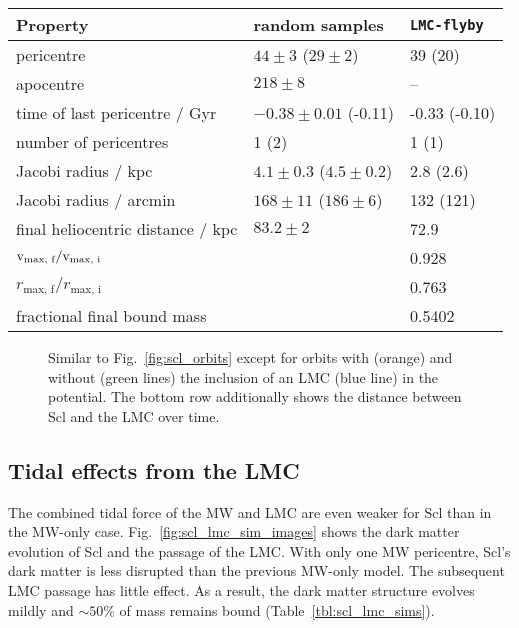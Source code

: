 \begin{table*}[t]
\centering
\caption[Orbits and results for Scl in the LMC potential.]{The orbital properties and dark matter evolution for the models including an LMC. Similar to Table \ref{tbl:scl_sim_results} except quantities with respect to the LMC are in parentheses. }
\label{tbl:scl_lmc_sims}
\begin{tabular}{lll}
\toprule
Property & random samples & \texttt{LMC-flyby}\\
\midrule
pericentre & $44\pm 3$ ($29 \pm 2$) & 39 (20)\\
apocentre & $218 \pm 8$ & –\\
time of last pericentre / Gyr & $-0.38\pm0.01$ (-0.11) & -0.33 (-0.10)\\
number of pericentres & 1 (2) & 1 (1)\\
Jacobi radius / kpc & $4.1\pm0.3$ ($4.5\pm0.2$) & 2.8 (2.6)\\
Jacobi radius / arcmin & $168 \pm 11$ ($186\pm6$) & 132 (121)\\
final heliocentric distance / kpc & $83.2\pm2$ & 72.9\\
${\rm v}_\textrm{max, f} / {\rm v}_\textrm{max, i}$ &  & 0.928\\
$r_\textrm{max, f} / r_\textrm{max, i}$ &  & 0.763\\
fractional final bound mass &  & 0.5402\\
\bottomrule
\end{tabular}
\end{table*}

\begin{figure}
\centering
{}
\caption[Sculptor orbits with LMC]{Similar to Fig.~\ref{fig:scl_orbits}
except for orbits with (orange) and without (green lines) the inclusion
of an LMC (blue line) in the potential. The bottom row additionally
shows the distance between Scl and the LMC over
time.}\label{fig:scl_lmc_orbits_effect}
\end{figure}

\subsection{Tidal effects from the
LMC}\label{tidal-effects-from-the-lmc}

The combined tidal force of the MW and LMC are even weaker for Scl than
in the MW-only case. Fig.~\ref{fig:scl_lmc_sim_images} shows the dark
matter evolution of Scl and the passage of the LMC. With only one MW
pericentre, Scl's dark matter is less disrupted than the previous
MW-only model. The subsequent LMC passage has little effect. As a
result, the dark matter structure evolves mildly and \(\sim 50\%\) of
mass remains bound (Table~\ref{tbl:scl_lmc_sims}).

